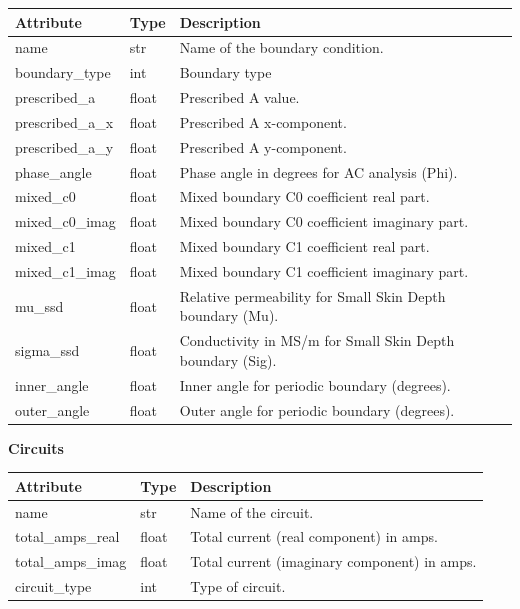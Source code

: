 \documentclass[11pt,a4paper]{article}
\begin{document}
\begin{table}[h]
  \centering
  \renewcommand{\arraystretch}{1.3}
  \footnotesize
  \begin{tabularx}{\textwidth}{>{\raggedright\arraybackslash}p{3.5cm} 
                  >{\raggedright\arraybackslash}p{2.5cm}
                  >{\raggedright\arraybackslash}X}
    \toprule
    \textbf{Attribute} & \textbf{Type} & \textbf{Description} \\
    \midrule
    name & str & Name of the boundary condition. \\
    boundary\_type & int & Boundary type \\
    prescribed\_a & float & Prescribed A value. \\
    prescribed\_a\_x & float & Prescribed A x-component. \\
    prescribed\_a\_y & float & Prescribed A y-component. \\
    phase\_angle & float & Phase angle in degrees for AC analysis (Phi). \\
    mixed\_c0 & float & Mixed boundary C0 coefficient real part. \\
    mixed\_c0\_imag & float & Mixed boundary C0 coefficient imaginary part. \\
    mixed\_c1 & float & Mixed boundary C1 coefficient real part. \\
    mixed\_c1\_imag & float & Mixed boundary C1 coefficient imaginary part. \\
    mu\_ssd & float & Relative permeability for Small Skin Depth boundary (Mu). \\
    sigma\_ssd & float & Conductivity in MS/m for Small Skin Depth boundary (Sig). \\
    inner\_angle & float & Inner angle for periodic boundary (degrees). \\
    outer\_angle & float & Outer angle for periodic boundary (degrees). \\
    \bottomrule
  \end{tabularx}
\end{table}

\vspace{0.5cm}
\noindent\textbf{Circuits}

\begin{table}[h]
  \centering
  \renewcommand{\arraystretch}{1.3}
  \footnotesize
  \begin{tabularx}{\textwidth}{>{\raggedright\arraybackslash}p{3.5cm} 
                  >{\raggedright\arraybackslash}p{2.5cm}
                  >{\raggedright\arraybackslash}X}
    \toprule
    \textbf{Attribute} & \textbf{Type} & \textbf{Description} \\
    \midrule
    name & str & Name of the circuit. \\
    total\_amps\_real & float & Total current (real component) in amps. \\
    total\_amps\_imag & float & Total current (imaginary component) in amps. \\
    circuit\_type & int & Type of circuit. \\
    \bottomrule
  \end{tabularx}
\end{table}
\end{document}
